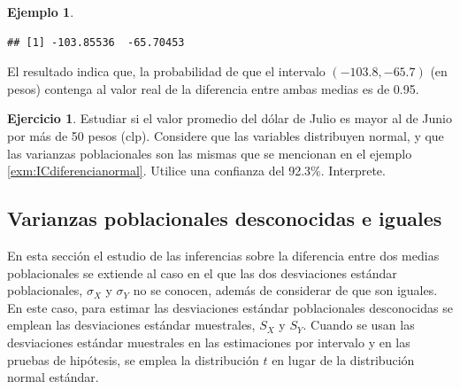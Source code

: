 \documentclass[
  11pt,
]{book}
\theoremstyle{definition}
\theoremstyle{definition}
\newtheorem{example}{Ejemplo}[chapter]
\theoremstyle{definition}
\newtheorem{exercise}{Ejercicio}[chapter]
\theoremstyle{definition}
\theoremstyle{remark}
\begin{document}
\begin{example}
\begin{verbatim}
## [1] -103.85536  -65.70453
\end{verbatim}

El resultado indica que, la probabilidad de que el intervalo \((-103.8,  -65.7)\) (en pesos) contenga al valor real de la diferencia entre ambas medias es de 0.95.
\end{example}

\begin{exercise}
Estudiar si el valor promedio del dólar de Julio es mayor al de Junio por más de 50 pesos (clp). Considere que las variables distribuyen normal, y que las varianzas poblacionales son las mismas que se mencionan en el ejemplo \ref{exm:ICdiferencianormal}. Utilice una confianza del 92.3\%. Interprete.
\end{exercise}

\subsection{Varianzas poblacionales desconocidas e iguales}\label{intervalo-de-confianza-para-la-diferencia-de-medias-varianzas-desconocidas-iguales}

En esta sección el estudio de las inferencias sobre la diferencia entre dos medias poblacionales se extiende al caso en el que las dos desviaciones estándar poblacionales, \(\sigma_X\) y \(\sigma_Y\) no se conocen, además de considerar de que son iguales. En este caso, para estimar las desviaciones estándar poblacionales desconocidas se emplean las desviaciones estándar muestrales, \(S_X\) y \(S_Y\). Cuando se usan las desviaciones estándar muestrales en las estimaciones por intervalo y en las pruebas de hipótesis, se emplea la distribución \(t\) en lugar de la distribución normal estándar.

\begin{table}[H]
\centering
\caption{\label{tab:unnamed-chunk-11}Intervalos de confianza para la diferencia de medias de dos distribucones normales y varianzas poblacionales desconocidas e iguales}
\centering
{}
\end{table}
\end{document}
